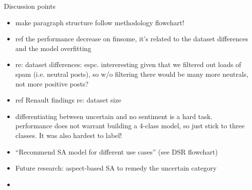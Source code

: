 \newpage
Discussion points
\begin{itemize}[noitemsep]
	\item make paragraph structure follow methodology flowchart!
	\item ref the performance decrease on finsome, it's related to the dataset differences and the model overfitting
	\item re: dataset differences: espc. intereresting given that we filtered out loads of spam (i.e. neutral posts), so w/o filtering there would be many more neutrals, not more positive posts?
	\item ref Renault findings re: dataset size
	\item differentiating between uncertain and no sentiment is a hard task. performance does not warrant building a 4-class model, so just stick to three classes. It was also hardest to label!
	\item ``Recommend SA model for different use cases'' (see DSR flowchart)
	\item Future research: aspect-based SA to remedy the uncertain category
	\item 
\end{itemize}